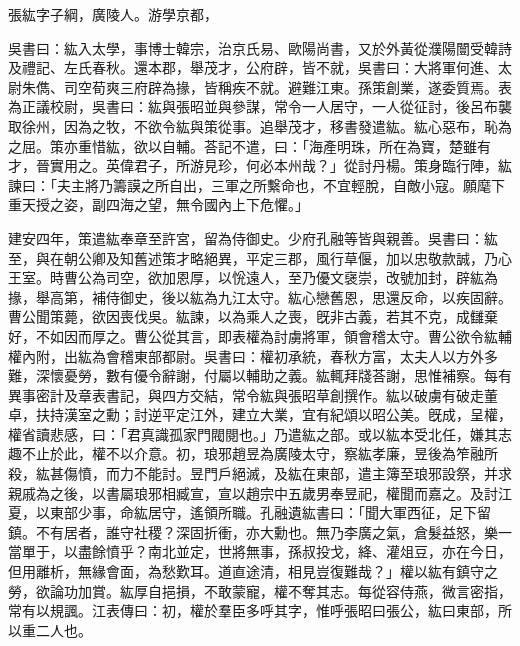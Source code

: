 
\begin{pinyinscope}
張紘字子綱，廣陵人。游學京都，

吳書曰：紘入太學，事博士韓宗，治京氏易、歐陽尚書，又於外黃從濮陽闓受韓詩及禮記、左氏春秋。還本郡，舉茂才，公府辟，皆不就，吳書曰：大將軍何進、太尉朱儁、司空荀爽三府辟為掾，皆稱疾不就。避難江東。孫策創業，遂委質焉。表為正議校尉，吳書曰：紘與張昭並與參謀，常令一人居守，一人從征討，後呂布襲取徐州，因為之牧，不欲令紘與策從事。追舉茂才，移書發遣紘。紘心惡布，恥為之屈。策亦重惜紘，欲以自輔。荅記不遣，曰：「海產明珠，所在為寶，楚雖有才，晉實用之。英偉君子，所游見珍，何必本州哉？」從討丹楊。策身臨行陣，紘諫曰：「夫主將乃籌謨之所自出，三軍之所繫命也，不宜輕脫，自敵小寇。願麾下重天授之姿，副四海之望，無令國內上下危懼。」

建安四年，策遣紘奉章至許宮，留為侍御史。少府孔融等皆與親善。吳書曰：紘至，與在朝公卿及知舊述策才略絕異，平定三郡，風行草偃，加以忠敬款誠，乃心王室。時曹公為司空，欲加恩厚，以恱遠人，至乃優文襃崇，改號加封，辟紘為掾，舉高第，補侍御史，後以紘為九江太守。紘心戀舊恩，思還反命，以疾固辭。曹公聞策薨，欲因喪伐吳。紘諫，以為乘人之喪，旣非古義，若其不克，成讎棄好，不如因而厚之。曹公從其言，即表權為討虜將軍，領會稽太守。曹公欲令紘輔權內附，出紘為會稽東部都尉。吳書曰：權初承統，春秋方富，太夫人以方外多難，深懷憂勞，數有優令辭謝，付屬以輔助之義。紘輒拜牋荅謝，思惟補察。每有異事密計及章表書記，與四方交結，常令紘與張昭草創撰作。紘以破虜有破走董卓，扶持漢室之勳；討逆平定江外，建立大業，宜有紀頌以昭公美。旣成，呈權，權省讀悲感，曰：「君真識孤家門閥閱也。」乃遣紘之部。或以紘本受北任，嫌其志趣不止於此，權不以介意。初，琅邪趙昱為廣陵太守，察紘孝廉，昱後為笮融所殺，紘甚傷憤，而力不能討。昱門戶絕滅，及紘在東部，遣主簿至琅邪設祭，并求親戚為之後，以書屬琅邪相臧宣，宣以趙宗中五歲男奉昱祀，權聞而嘉之。及討江夏，以東部少事，命紘居守，遙領所職。孔融遺紘書曰：「聞大軍西征，足下留鎮。不有居者，誰守社稷？深固折衝，亦大勳也。無乃李廣之氣，倉髮益怒，樂一當單于，以盡餘憤乎？南北並定，世將無事，孫叔投戈，絳、灌俎豆，亦在今日，但用離析，無緣會面，為愁歎耳。道直途清，相見豈復難哉？」權以紘有鎮守之勞，欲論功加賞。紘厚自挹損，不敢蒙寵，權不奪其志。每從容侍燕，微言密指，常有以規諷。江表傳曰：初，權於羣臣多呼其字，惟呼張昭曰張公，紘曰東部，所以重二人也。


\end{pinyinscope}

